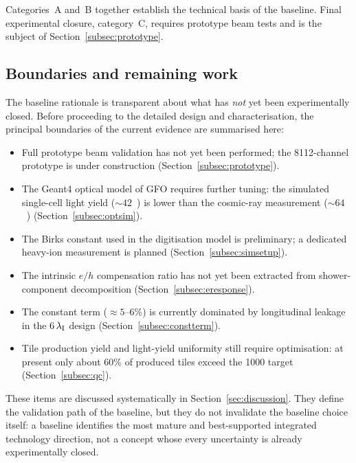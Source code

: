 Categories~A and~B together establish the technical basis of the
baseline.
Final experimental closure, category~C, requires prototype beam tests
and is the subject of Section~\ref{subsec:prototype}.

\subsection{Boundaries and remaining work}
\label{subsec:boundaries}

The baseline rationale is transparent about what has \emph{not} yet
been experimentally closed.
Before proceeding to the detailed design and characterisation, the
principal boundaries of the current evidence are summarised here:

\begin{itemize}
\item Full prototype beam validation has not yet been performed; the
  8112-channel prototype is under construction
  (Section~\ref{subsec:prototype}).
\item The Geant4 optical model of GFO requires further tuning: the
  simulated single-cell light yield (${\sim}42$~\peMIP) is lower
  than the cosmic-ray measurement (${\sim}64$~\peMIP)
  (Section~\ref{subsec:optsim}).
\item The Birks constant used in the digitisation model is
  preliminary; a dedicated heavy-ion measurement is planned
  (Section~\ref{subsec:simsetup}).
\item The intrinsic $e/h$ compensation ratio has not yet been
  extracted from shower-component decomposition
  (Section~\ref{subsec:eresponse}).
\item The constant term (${\approx}5$--6\%) is currently dominated by
  longitudinal leakage in the $6\,\lambda_{\mathrm{I}}$ design
  (Section~\ref{subsec:constterm}).
\item Tile production yield and light-yield uniformity still require
  optimisation: at present only about 60\% of produced tiles exceed
  the \SI{1000}{\phMeV} target (Section~\ref{subsec:qc}).
\end{itemize}

These items are discussed systematically in
Section~\ref{sec:discussion}.
They define the validation path of the baseline, but they do not
invalidate the baseline choice itself: a baseline identifies the most
mature and best-supported integrated technology direction, not a
concept whose every uncertainty is already experimentally closed.

